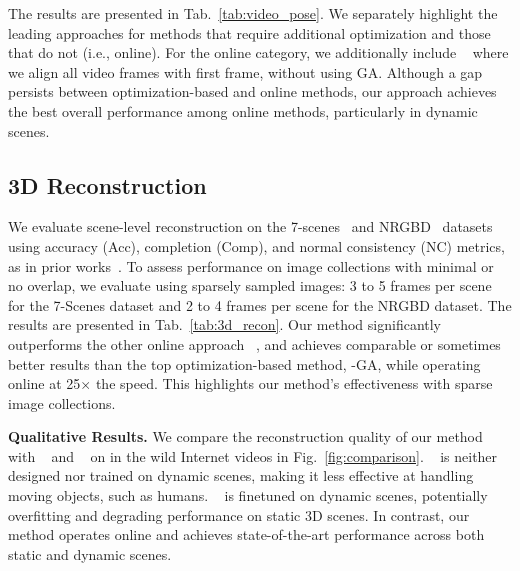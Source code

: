 The results are presented in Tab.~\ref{tab:video_pose}. We separately highlight the leading approaches for methods that require additional optimization and those that do not (i.e., online). 
For the online category, we additionally include \duster{}~\cite{wang2024dust3r} where we align all video frames with first frame, without using GA. Although a gap persists between optimization-based and online methods, our approach achieves the best overall performance among online methods, particularly in dynamic scenes. 









\subsection{3D Reconstruction}
\label{sec:exp_recon}
We evaluate scene-level reconstruction on the 7-scenes~\cite{shotton2013scene} and NRGBD~\cite{azinovic2022neural} datasets using accuracy (Acc), completion (Comp), and normal consistency (NC) metrics, as in prior works~\cite{spann3r, azinovic2022neural, zhu2022nice, wang2023co, wang2024dust3r}.
To assess performance on image collections with minimal or no overlap, we evaluate using sparsely sampled images: 3 to 5 frames per scene for the 7-Scenes dataset and 2 to 4 frames per scene for the NRGBD dataset.
The results are presented in Tab.~\ref{tab:3d_recon}. Our method significantly outperforms the other online approach \spanner{}~\cite{spann3r}, and achieves comparable or sometimes better results than the top optimization-based method, \duster{}-GA, while operating online at 25$\times$ the speed. This highlights our method’s effectiveness with sparse image collections. 




\vspace{0.5em}
\noindent\textbf{Qualitative Results.} 
We compare the reconstruction quality of our method with \spanner{}~\cite{spann3r} and \monster{}~\cite{zhang2024monst3r} on in the wild Internet videos in Fig.~\ref{fig:comparison}. \spanner{}~\cite{spann3r} is neither designed nor trained on dynamic scenes, making it less effective at handling moving objects, such as humans.
\monster{}~\cite{zhang2024monst3r} is finetuned on dynamic scenes, potentially overfitting and degrading performance on static 3D scenes. %
In contrast, our method operates online and achieves state-of-the-art performance across both static and dynamic scenes.


